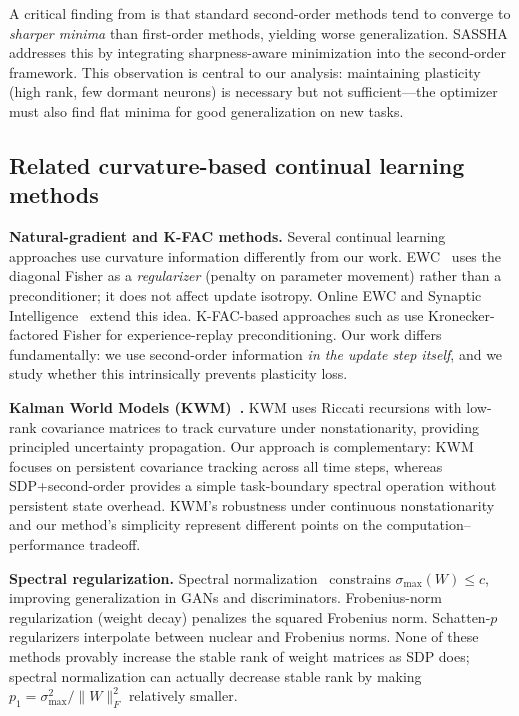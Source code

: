 \documentclass{article}
\begin{document}
A critical finding from \citet{shin2025sassha} is that standard second-order methods tend to converge to \emph{sharper minima} than first-order methods, yielding worse generalization. SASSHA addresses this by integrating sharpness-aware minimization into the second-order framework. This observation is central to our analysis: maintaining plasticity (high rank, few dormant neurons) is necessary but not sufficient---the optimizer must also find flat minima for good generalization on new tasks.

\subsection{Related curvature-based continual learning methods}

\textbf{Natural-gradient and K-FAC methods.} Several continual learning approaches use curvature information differently from our work. EWC~\citep{kirkpatrick2017ewc} uses the diagonal Fisher as a \emph{regularizer} (penalty on parameter movement) rather than a preconditioner; it does not affect update isotropy. Online EWC and Synaptic Intelligence~\citep{zenke2017continual} extend this idea. K-FAC-based approaches such as \citet{urettini2025ocar} use Kronecker-factored Fisher for experience-replay preconditioning. Our work differs fundamentally: we use second-order information \emph{in the update step itself}, and we study whether this intrinsically prevents plasticity loss.

\textbf{Kalman World Models (KWM)~\citep{elsayed2024kalman}.} KWM uses Riccati recursions with low-rank covariance matrices to track curvature under nonstationarity, providing principled uncertainty propagation. Our approach is complementary: KWM focuses on persistent covariance tracking across all time steps, whereas SDP+second-order provides a simple task-boundary spectral operation without persistent state overhead. KWM's robustness under continuous nonstationarity and our method's simplicity represent different points on the computation--performance tradeoff.

\textbf{Spectral regularization.} Spectral normalization~\citep{miyato2018spectral} constrains $\sigma_{\max}(W) \leq c$, improving generalization in GANs and discriminators. Frobenius-norm regularization (weight decay) penalizes the squared Frobenius norm. Schatten-$p$ regularizers interpolate between nuclear and Frobenius norms. None of these methods provably increase the stable rank of weight matrices as SDP does; spectral normalization can actually decrease stable rank by making $p_1 = \sigma_{\max}^2/\|W\|_F^2$ relatively smaller.
\end{document}
